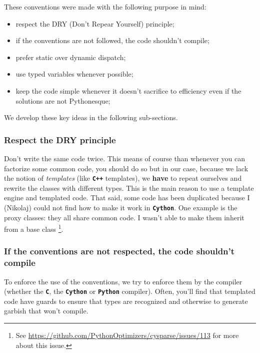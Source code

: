 \documentclass[letterpaper,10pt,english]{sphinxmanual}
\begin{document}
These conventions were made with the following purpose in mind:
\begin{itemize}
\item {} 
respect the DRY (Don't Repear Yourself) principle;

\item {} 
if the conventions are not followed, the code shouldn't compile;

\item {} 
prefer static over dynamic dispatch;

\item {} 
use typed variables whenever possible;

\item {} 
keep the code simple whenever it doesn't sacrifice to efficiency even if the solutions are not Pythonesque;

\end{itemize}

We develop these key ideas in the following sub-sections.


\subsubsection{Respect the DRY principle}
\label{cysparse_lib_mainteners:respect-the-dry-principle}
Don't write the same code twice. This means of course than whenever you can factorize some common code, you should do so but in our case, because we lack the notion of \emph{templates} (like \textbf{\texttt{C++}} templates), we
\textbf{have} to repeat ourselves and rewrite the classes with different types. This is the main reason to use a template engine and templated code. That said, some code has been duplicated because I (Nikolaj) could not find
how to make it work in \textbf{\texttt{Cython}}. One example is the proxy classes: they all share common code. I wasn't able to make them inherit from a base class \footnote{
See \href{https://github.com/PythonOptimizers/cysparse/issues/113}{https://github.com/PythonOptimizers/cysparse/issues/113} for more about this issue.
}.


\subsubsection{If the conventions are not respected, the code shouldn't compile}
\label{cysparse_lib_mainteners:if-the-conventions-are-not-respected-the-code-shouldn-t-compile}
To enforce the use of the conventions, we try to enforce them by the compiler (whether the \textbf{\texttt{C}}, the \textbf{\texttt{Cython}} or \textbf{\texttt{Python}} compiler). Often, you'll find that templated code have guards to ensure that
types are recognized and otherwise to generate garbish that won't compile.
\end{document}
